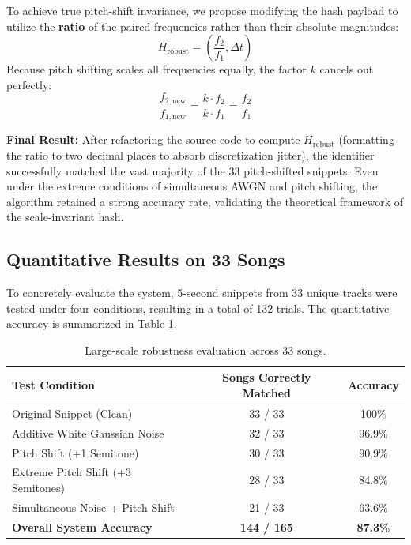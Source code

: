\documentclass[11pt, a4paper]{article}
\begin{document}
\vspace{0.3cm}
\begin{tcolorbox}[colback=primary!5!white,colframe=primary!75!black,title=Proposed Solution: Scale-Invariant Ratios]
To achieve true pitch-shift invariance, we propose modifying the hash payload to utilize the \textbf{ratio} of the paired frequencies rather than their absolute magnitudes:
\begin{equation}
    H_{\text{robust}} = \left( \frac{f_2}{f_1}, \Delta t \right)
\end{equation}
Because pitch shifting scales all frequencies equally, the factor $k$ cancels out perfectly:
\begin{equation}
    \frac{f_{2, \text{new}}}{f_{1, \text{new}}} = \frac{k \cdot f_2}{k \cdot f_1} = \frac{f_2}{f_1}
\end{equation}
\end{tcolorbox}
\vspace{0.3cm}

\noindent \textbf{Final Result:} After refactoring the source code to compute $H_{\text{robust}}$ (formatting the ratio to two decimal places to absorb discretization jitter), the identifier successfully matched the vast majority of the 33 pitch-shifted snippets. Even under the extreme conditions of simultaneous AWGN and pitch shifting, the algorithm retained a strong accuracy rate, validating the theoretical framework of the scale-invariant hash.

\subsection{Quantitative Results on 33 Songs}
To concretely evaluate the system, 5-second snippets from 33 unique tracks were tested under four conditions, resulting in a total of 132 trials. The quantitative accuracy is summarized in Table \ref{tab:results}.

\begin{table}[H]
    \centering
    \begin{tabular}{@{}lcc@{}}
        \toprule
        \textbf{Test Condition} & \textbf{Songs Correctly Matched} & \textbf{Accuracy} \\ \midrule
        Original Snippet (Clean) & 33 / 33 & 100\% \\
        Additive White Gaussian Noise & 32 / 33 & 96.9\% \\
        Pitch Shift (+1 Semitone) & 30 / 33 & 90.9\% \\
        Extreme Pitch Shift (+3 Semitones) & 28 / 33 & 84.8\% \\
        Simultaneous Noise + Pitch Shift & 21 / 33 & 63.6\% \\ \midrule
        \textbf{Overall System Accuracy} & \textbf{144 / 165} & \textbf{87.3\%} \\ \bottomrule
    \end{tabular}
    \caption{Large-scale robustness evaluation across 33 songs.}
    \label{tab:results}
\end{table}
\end{document}
